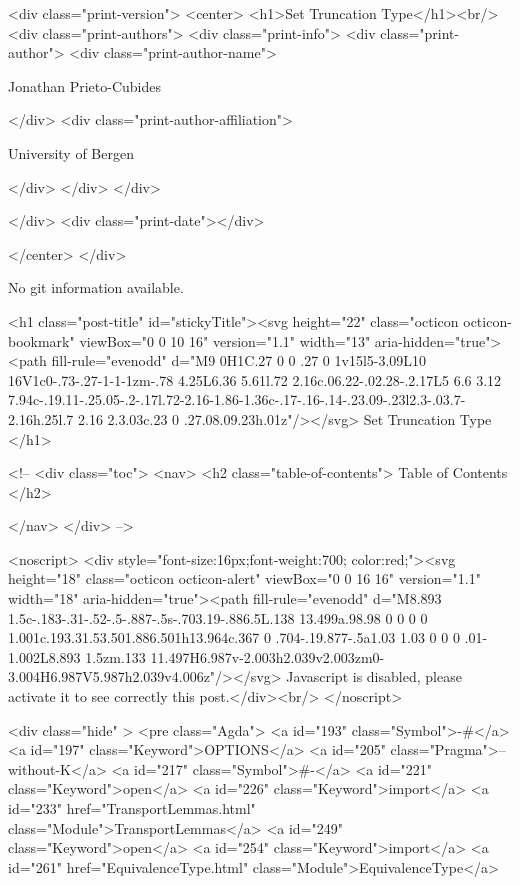   <div class="print-version">
    <center>
      <h1>Set Truncation Type</h1><br/>
        <div class="print-authors">
          <div class="print-info">
            <div class="print-author">
              <div class="print-author-name">
                
                  Jonathan Prieto-Cubides
                
              </div>
              <div class="print-author-affiliation">
                
                  University of Bergen
                
                </div>
            </div>
          </div>
          
          
        </div>
        <div class="print-date"></div>
        
        
    </center>
  </div>

  
  No git information available.
  
  <h1 class="post-title" id="stickyTitle"><svg height="22" class="octicon octicon-bookmark" viewBox="0 0 10 16" version="1.1" width="13" aria-hidden="true"><path fill-rule="evenodd" d="M9 0H1C.27 0 0 .27 0 1v15l5-3.09L10 16V1c0-.73-.27-1-1-1zm-.78 4.25L6.36 5.61l.72 2.16c.06.22-.02.28-.2.17L5 6.6 3.12 7.94c-.19.11-.25.05-.2-.17l.72-2.16-1.86-1.36c-.17-.16-.14-.23.09-.23l2.3-.03.7-2.16h.25l.7 2.16 2.3.03c.23 0 .27.08.09.23h.01z"/></svg> Set Truncation Type
  </h1>

  <!-- 
  <div class="toc">
    <nav>
    <h2 class="table-of-contents"> Table of Contents </h2>
      

    </nav>
  </div>
   -->

  <noscript>
  <div style="font-size:16px;font-weight:700; color:red;"><svg height="18" class="octicon octicon-alert" viewBox="0 0 16 16" version="1.1" width="18" aria-hidden="true"><path fill-rule="evenodd" d="M8.893 1.5c-.183-.31-.52-.5-.887-.5s-.703.19-.886.5L.138 13.499a.98.98 0 0 0 0 1.001c.193.31.53.501.886.501h13.964c.367 0 .704-.19.877-.5a1.03 1.03 0 0 0 .01-1.002L8.893 1.5zm.133 11.497H6.987v-2.003h2.039v2.003zm0-3.004H6.987V5.987h2.039v4.006z"/></svg> Javascript is disabled, please activate it to see correctly this post.</div><br/>
  </noscript>

  <div class="hide" >
<pre class="Agda">
<a id="193" class="Symbol">{-#</a> <a id="197" class="Keyword">OPTIONS</a> <a id="205" class="Pragma">--without-K</a> <a id="217" class="Symbol">#-}</a>
<a id="221" class="Keyword">open</a> <a id="226" class="Keyword">import</a> <a id="233" href="TransportLemmas.html" class="Module">TransportLemmas</a>
<a id="249" class="Keyword">open</a> <a id="254" class="Keyword">import</a> <a id="261" href="EquivalenceType.html" class="Module">EquivalenceType</a>


